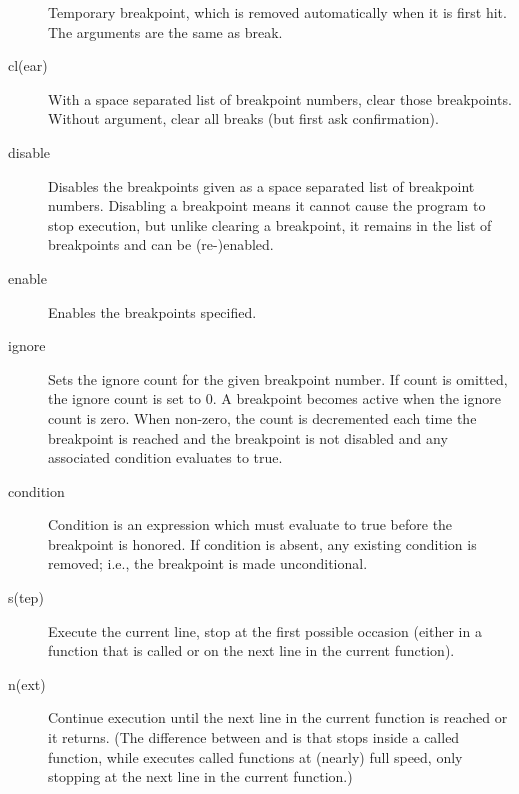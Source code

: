 \begin{description}
Temporary breakpoint, which is removed automatically when it is
first hit.  The arguments are the same as break.

\item[cl(ear) \optional{\var{bpnumber} \optional{\var{bpnumber ...}}}]

With a space separated list of breakpoint numbers, clear those
breakpoints.  Without argument, clear all breaks (but first
ask confirmation).

\item[disable \optional{\var{bpnumber} \optional{\var{bpnumber ...}}}]

Disables the breakpoints given as a space separated list of
breakpoint numbers.  Disabling a breakpoint means it cannot cause
the program to stop execution, but unlike clearing a breakpoint, it
remains in the list of breakpoints and can be (re-)enabled.

\item[enable \optional{\var{bpnumber} \optional{\var{bpnumber ...}}}]

Enables the breakpoints specified.

\item[ignore \var{bpnumber} \optional{\var{count}}]

Sets the ignore count for the given breakpoint number.  If
count is omitted, the ignore count is set to 0.  A breakpoint
becomes active when the ignore count is zero.  When non-zero,
the count is decremented each time the breakpoint is reached
and the breakpoint is not disabled and any associated condition
evaluates to true.

\item[condition \var{bpnumber} \optional{\var{condition}}]

Condition is an expression which must evaluate to true before
the breakpoint is honored.  If condition is absent, any existing
condition is removed; i.e., the breakpoint is made unconditional.

\item[s(tep)]

Execute the current line, stop at the first possible occasion
(either in a function that is called or on the next line in the
current function).

\item[n(ext)]

Continue execution until the next line in the current function
is reached or it returns.  (The difference between  and
 is that  stops inside a called function, while
 executes called functions at (nearly) full speed, only
stopping at the next line in the current function.)


\end{description}
